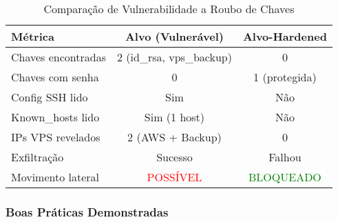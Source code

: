 \documentclass[12pt]{article}
\begin{document}
\begin{table}[h]
\centering
\begin{tabular}{|l|c|c|}
\hline
\textbf{Métrica} & \textbf{Alvo (Vulnerável)} & \textbf{Alvo-Hardened} \\ \hline
Chaves encontradas & 2 (id\_rsa, vps\_backup) & 0 \\ \hline
Chaves com senha & 0 & 1 (protegida) \\ \hline
Config SSH lido & Sim & Não \\ \hline
Known\_hosts lido & Sim (1 host) & Não \\ \hline
IPs VPS revelados & 2 (AWS + Backup) & 0 \\ \hline
Exfiltração & Sucesso & Falhou \\ \hline
Movimento lateral & \textcolor{red}{POSSÍVEL} & \textcolor{green}{BLOQUEADO} \\ \hline
\end{tabular}
\caption{Comparação de Vulnerabilidade a Roubo de Chaves}
\end{table}

\subsubsection{Boas Práticas Demonstradas}
\end{document}
